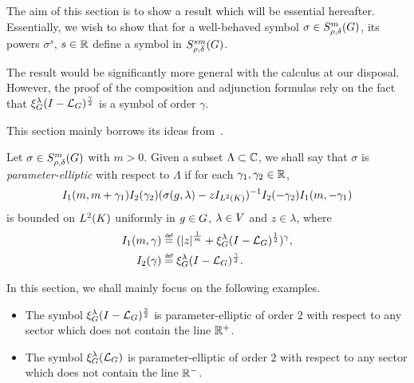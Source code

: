 The aim of this section is to show a result which will be essential hereafter.
Essentially, we wish to show that for a well-behaved symbol $\sigma \in S^{m}_{\rho, \delta}(G)$,
its powers $\sigma^s$, $s \in \mathbb{R}$ define a symbol in $S^{s m}_{\rho, \delta}(G)$.

The result would be significantly more general with the calculus at our disposal.
However, the proof of the composition and adjunction formulas rely on the fact that $\xi^{\lambda}_{G} (I - {\mathcal{L}_{G}})^\frac{\gamma}{2}$ is a symbol of order $\gamma$.

This section mainly borrows its ideas from~\cite{RuzhanskyWirth14}.

\begin{definition}
    Let $\sigma \in S^{m}_{\rho, \delta}(G)$ with $m > 0$.
    Given a subset $\Lambda \subset \mathbb{C}$,
    we shall say that $\sigma$ is \emph{parameter-elliptic} with respect to $\Lambda$
    if for each $\gamma_1, \gamma_2 \in \mathbb{R}$,
    \begin{align*}
        I_1(m, m + \gamma_1)
        I_2(\gamma_2)
        (\sigma(g, \lambda) - z {I_{{L^{2} (K)}}})^{-1}
        I_2(-\gamma_2)
        I_1(m, -\gamma_1)
    \end{align*}
    is bounded on ${L^{2} (K)}$ uniformly in $g \in G$, $\lambda \in V$ and $z \in \lambda$,
    where
    \begin{align*}
        I_1(m, \gamma) &\defeq (\abs z^{\frac 1 m} + \Rep \lambda \BesselPotential 1)^\gamma,\\
        I_2(\gamma) &\defeq \Rep \lambda \BesselPotential \gamma.
    \end{align*}
\end{definition}

\begin{example}
    In this section,
    we shall mainly focus on the following examples.

    \begin{itemize}
        \item The symbol $\xi^{\lambda}_{G} (I - {\mathcal{L}_{G}})^\frac{2}{2}$ is parameter-elliptic of order $2$ with respect to any sector which does not contain the line $\mathbb{R}^+$.
        \item The symbol $\xi^{\lambda}_{G} ({\mathcal{L}_{G}})$ is parameter-elliptic of order $2$ with respect to any sector which does not contain the line $\mathbb{R}^-$.
    \end{itemize}
\end{example}

